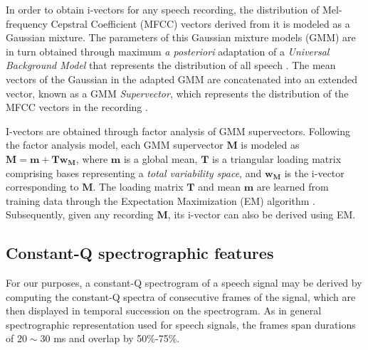 \documentclass[a4paper]{article}
\begin{document}
In order to obtain i-vectors for any speech recording, the distribution of Mel-frequency Cepstral Coefficient (MFCC) vectors derived from it is modeled as a Gaussian mixture. The parameters of this Gaussian mixture models (GMM) are in turn obtained through maximum {\em a posteriori} adaptation of a {\em Universal Background Model} that represents the distribution of all speech  \cite{reynolds1997comparison,reynolds2015universal}. The mean vectors of the Gaussian in the adapted GMM are concatenated into an extended vector, known as a GMM  \textit{Supervector}, which represents the distribution of the MFCC vectors in the recording  \cite{kinnunen2010overview}.

I-vectors are obtained through factor analysis of GMM supervectors. Following the factor analysis model, each GMM supervector $\mathbf{M}$ is modeled as $\mathbf{M} = \mathbf{m} + \mathbf{T}\mathbf{w_M}$, where $\mathbf{m}$ is a global mean, $\mathbf{T}$ is a triangular loading matrix comprising bases representing a {\em total variability space}, and $\mathbf{w_M}$ is the i-vector corresponding to $\mathbf{M}$. The loading matrix $\mathbf{T}$ and mean $\mathbf{m}$ are learned from training data through the Expectation Maximization (EM) algorithm  \cite{moon1996expectation}. Subsequently, given any recording $\mathbf{M}$, its i-vector can also be derived using EM.

\subsection{Constant-Q spectrographic features}
For our purposes, a constant-Q spectrogram of a speech signal may be derived by computing the constant-Q spectra of consecutive frames of the signal, which are then displayed in temporal succession on the spectrogram. As in general spectrographic representation used for speech signals, the frames span durations of $20 \sim 30$ ms and overlap by 50\%-75\%.
\end{document}
